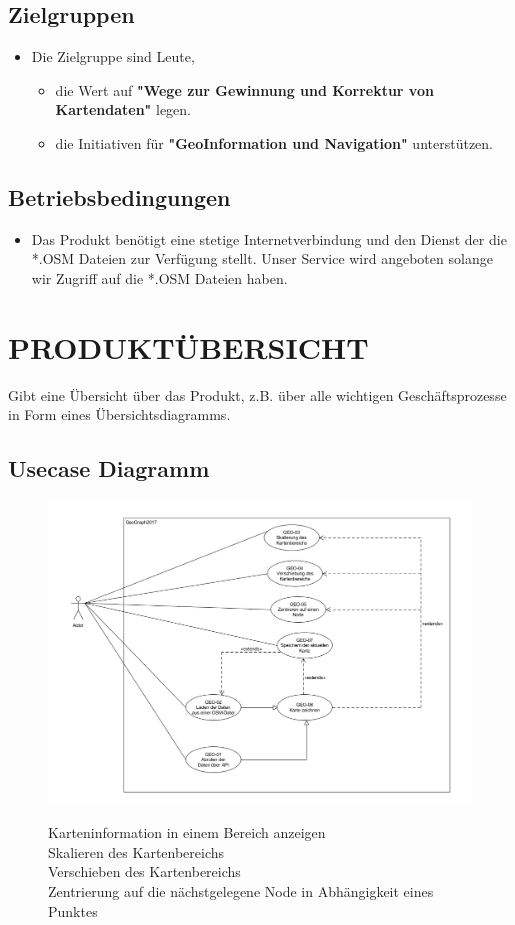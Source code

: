 	\subsection{Zielgruppen}
	\begin{itemize}
		\item Die Zielgruppe sind Leute, 
		\begin{itemize}
			\item die Wert auf \textbf{"Wege zur Gewinnung und Korrektur von Kartendaten"} legen.
			\item die Initiativen für \textbf{"GeoInformation und Navigation"} unterstützen.
		\end{itemize}
	\end{itemize}
	\subsection{Betriebsbedingungen}
	\begin{itemize}
		\item Das Produkt benötigt eine stetige Internetverbindung und den Dienst der die *.OSM Dateien zur Verfügung stellt. Unser Service wird angeboten solange wir Zugriff auf die *.OSM Dateien haben.
	\end{itemize}
	
	
	\section{\Large PRODUKTÜBERSICHT}
	Gibt eine Übersicht über das Produkt, z.B. über alle wichtigen Geschäftsprozesse in Form eines Übersichtsdiagramms.
	\subsection{Usecase Diagramm}
		\begin{figure}[H]
			\centering
			\includegraphics[width=0.7\linewidth]{images/Usecases}
			\caption{}
			\label{fig:GUI}
			Karteninformation in einem Bereich anzeigen \\
			Skalieren des Kartenbereichs \\
			Verschieben des Kartenbereichs \\
			Zentrierung auf die nächstgelegene Node in Abhängigkeit eines Punktes\\
		\end{figure}
		
